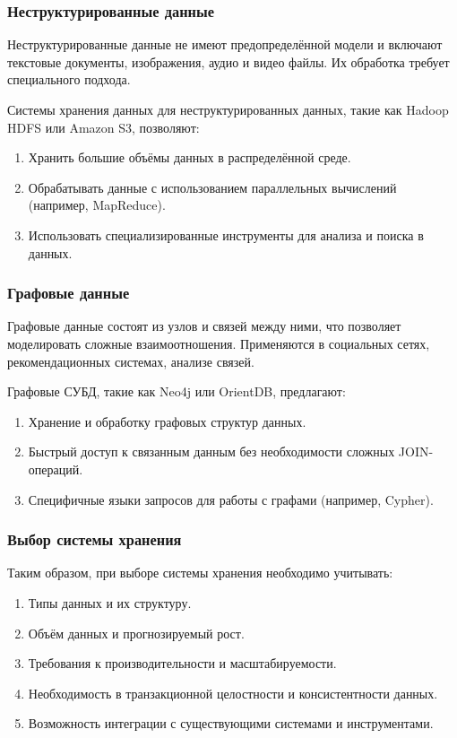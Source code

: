 \subsubsection{Неструктурированные данные}

Неструктурированные данные не имеют предопределённой модели и включают текстовые документы, изображения, аудио и видео файлы. Их обработка требует специального подхода.

\clearpage
Системы хранения данных для неструктурированных данных, такие как Hadoop HDFS или Amazon S3, позволяют:

\begin{enumerate}
    \item Хранить большие объёмы данных в распределённой среде.
    \item Обрабатывать данные с использованием параллельных вычислений (например, MapReduce).
    \item Использовать специализированные инструменты для анализа и поиска в данных.
\end{enumerate}

\subsubsection{Графовые данные}

Графовые данные состоят из узлов и связей между ними, что позволяет моделировать сложные взаимоотношения. 
Применяются в социальных сетях, рекомендационных системах, анализе связей.

Графовые СУБД, такие как Neo4j или OrientDB, предлагают:

\begin{enumerate}
    \item Хранение и обработку графовых структур данных.
    \item Быстрый доступ к связанным данным без необходимости сложных JOIN-операций.
    \item Специфичные языки запросов для работы с графами (например, Cypher).
\end{enumerate}

\subsubsection{Выбор системы хранения}

Таким образом, при выборе системы хранения необходимо учитывать:

\begin{enumerate}
    \item Типы данных и их структуру.
    \item Объём данных и прогнозируемый рост.
    \item Требования к производительности и масштабируемости.
    \item Необходимость в транзакционной целостности и консистентности данных.
    \item Возможность интеграции с существующими системами и инструментами.
\end{enumerate}

